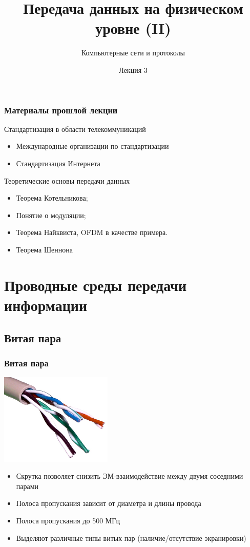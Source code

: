 \documentclass[utf8]{beamer}
\title{Передача данных на физическом уровне (II)}
\author {Компьютерные сети и протоколы}
\date{Лекция 3}
\begin{document}
\begin{frame}
\titlepage
\end{frame}
\begin{frame}
\frametitle{Материалы прошлой лекции}
\begin{block}{Стандартизация в области телекоммуникаций}
\begin{itemize}
 \item Международные организации по стандартизации
 \item Стандартизация Интернета
\end{itemize}
\end{block}
\begin{block}{Теоретические основы передачи данных}
\begin{itemize}
 \item Теорема Котельникова;
 \item Понятие о модуляции;
 \item Теорема Найквиста, OFDM в качестве примера.
 \item Теорема Шеннона
\end{itemize}
\end{block}
\end{frame}
\section{Проводные среды передачи информации}
\subsection{Витая пара}
\begin{frame}
\frametitle{Витая пара}
\begin{center}
\includegraphics[width=0.4\textwidth]{pics/UTP.png}
\end{center}
\begin{itemize}
 \item Скрутка позволяет снизить ЭМ-взаимодействие между двумя соседними парами
 \item Полоса пропускания зависит от диаметра и длины провода
 \item Полоса пропускания до 500 МГц
 \item Выделяют различные типы витых пар (наличие/отсутствие экранировки)
\end{itemize}
\end{frame}
\end{document}
